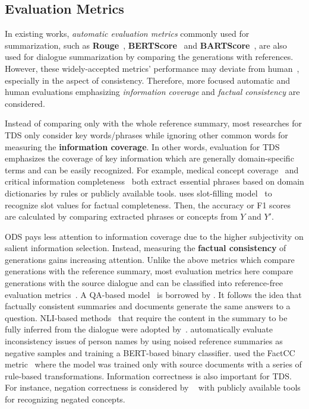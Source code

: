 \subsection{Evaluation Metrics}
\label{sec:evalmetric}
In existing works, \textit{automatic evaluation metrics} commonly used for summarization, such as \textbf{Rouge}~\cite{lin2004rouge}, %
\textbf{BERTScore}~\cite{zhang2019bertscore} and \textbf{BARTScore}~\cite{yuan2021bartscore}, are also used for dialogue summarization by comparing the generations with references. However, these widely-accepted metrics' performance may deviate from human~\cite{hanna2021fine}, especially in the aspect of consistency. Therefore, more focused automatic and human evaluations emphasizing \textit{information coverage} and \textit{factual consistency} are considered.


Instead of comparing only with the whole reference summary, most researches for TDS only consider key words/phrases
while ignoring other common words for measuring the \textbf{information coverage}.  In other words, evaluation for TDS emphasizes the coverage of key information which are generally domain-specific terms and can be easily recognized.
For example, {medical concept coverage}~\cite{joshi2020dr,zhang2021leveraging} 
and {critical information completeness}~\cite{yuan2019scaffolds} both
extract essential phrases based on domain dictionaries by 
rules or publicly available tools. 
\citet{zhao2021give} uses slot-filling model~\cite{chen2019bert} to recognize slot values for {factual completeness}.
Then, the accuracy or F1 scores are 
calculated by comparing extracted phrases or concepts from $Y$ and $Y'$. 


ODS pays less attention to information coverage due to the higher subjectivity on salient information selection. Instead, measuring the \textbf{factual consistency} of generations gains increasing attention. Unlike the above metrics which compare generations with the reference summary, 
most evaluation metrics here compare generations with the source dialogue and can be classified into reference-free evaluation metrics~\cite{shao2017efficient,liu2022reference}.
A QA-based model~\cite{wang2020asking} is borrowed by \citet{zhao2021give}.
It follows the idea that factually consistent summaries and documents generate the same answers to a question.
NLI-based methods~\cite{maynez2020faithfulness} that require the content in the summary to be fully inferred from the dialogue were adopted by~\citet{liu2022data}.
\citet{liu2021controllable} automatically evaluate {inconsistency} issues 
of person names by using noised reference summaries as negative samples and training a BERT-based binary classifier.
\citet{asi2022end} used the FactCC metric~\cite{kryscinski2020evaluating} where the model was trained only with source documents with a series of rule-based transformations.
Information correctness is also important for TDS. For instance, negation correctness is considered by ~\citet{joshi2020dr} with 
publicly available tools for recognizing 
negated concepts.

